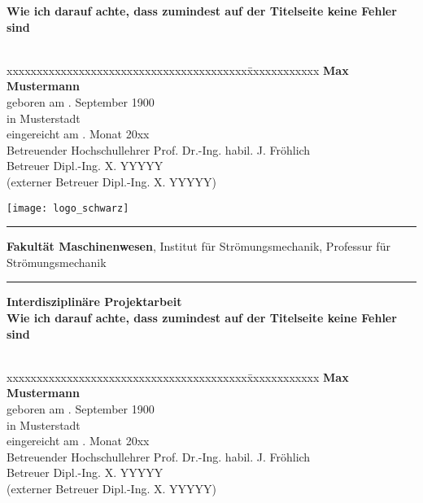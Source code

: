 \begin{titlepage}
%
\vspace{1.5cm}
%
\textbf{\LARGE Wie ich darauf achte, dass zumindest auf der Titelseite keine Fehler sind}\\[1.5cm]
%
\\[2.6cm]
\normalsize
\begin{tabbing}
xxxxxxxxxxxxxxxxxxxxxxxxxxxxxxxxxxxxxxxx\=xxxxxxxxxxxx\kill
        														\>	\textbf{Max Mustermann}													\\
geboren am													. September 1900															\\
in																	\>	Musterstadt																			\\[0.2cm]
eingereicht am											. Monat 20xx																	\\[0.5cm]
Betreuender Hochschullehrer					\>  Prof. Dr.-Ing. habil. J. Fr\"ohlich							\\
Betreuer														\>	Dipl.-Ing. X. YYYYY															\\
(externer Betreuer									\>	Dipl.-Ing. X. YYYYY)													 	\\
\end{tabbing}
\cleardoublepage
%
%
\hspace{-2.1cm} \texttt{[image: logo\_schwarz]}
\vspace{0.5cm}
\hrule 
\vspace{0.05cm}
\small\textbf{Fakult\"at Maschinenwesen},
Institut f\"ur Str\"omungsmechanik,
Professur f\"ur Str\"omungsmechanik
\vspace{0.1cm}
\hrule 
\vspace{4cm}
\textbf{\Large Interdisziplin\"are Projektarbeit}\\


%
\vspace{1.5cm}
%
\textbf{\LARGE Wie ich darauf achte, dass zumindest auf der Titelseite keine Fehler sind}\\[1.5cm]
%
\\[2cm]
\normalsize
\begin{tabbing}
xxxxxxxxxxxxxxxxxxxxxxxxxxxxxxxxxxxxxxxx\=xxxxxxxxxxxx\kill
         														\>	\textbf{Max Mustermann}									\\
geboren am													. September 1900											\\
in																	\>	Musterstadt															\\[0.2cm]
eingereicht am											. Monat 20xx													\\[0.5cm]
Betreuender Hochschullehrer					\>  Prof. Dr.-Ing. habil. J. Fr\"ohlich			\\
Betreuer														\>	Dipl.-Ing. X. YYYYY											\\
(externer Betreuer									\>	Dipl.-Ing. X. YYYYY)										\\
\end{tabbing}


\end{titlepage}

